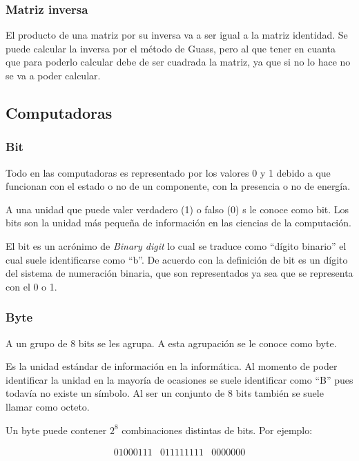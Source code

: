 \documentclass[a4paper]{article}
\begin{document}
\subsubsection{Matriz inversa}
El producto de una matriz por su inversa va a ser igual a la matriz identidad. Se puede calcular la inversa por el método de Guass, pero al que tener en cuanta que para poderlo calcular debe de ser cuadrada la matriz, ya que si no lo hace no se va a poder calcular.

\subsection{Computadoras}

\subsubsection{Bit}
Todo en las computadoras es representado por los valores 0 y 1 debido a que
funcionan con el estado o no de un componente, con la presencia o no de
energía.

A una unidad que puede valer verdadero (1) o falso (0) s le conoce como bit.
Los bits son la unidad más pequeña de información en las ciencias de la
computación.

El bit es un acrónimo de \textit{Binary digit} lo cual se traduce como “dígito binario” el cual suele identificarse como “b”. De acuerdo con la definición de bit es un dígito del sistema de numeración binaria, que son representados ya sea que se representa con el 0 o 1.

\autocite{BIT}

\subsubsection{Byte}
A un grupo de 8 bits se les agrupa. A esta agrupación se le conoce como byte.

Es la unidad estándar de información en la informática. Al momento de poder identificar la unidad en la mayoría de ocasiones se suele identificar como “B” pues todavía no existe un símbolo. Al ser un conjunto de 8 bits también se suele llamar como octeto.

\autocite{BYTE}

Un byte puede contener $2^8$ combinaciones distintas de bits. Por ejemplo:

\[
\begin{array}{ccc}
    01000111 & 011111111 & 0000000
\end{array}
\]
\end{document}
